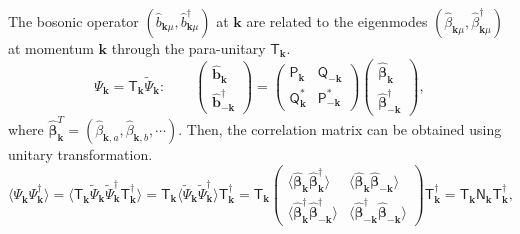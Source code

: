 \documentclass[aps, prx, nofootinbib, superscriptaddress]{revtex4-2}
\newcommand{\kvec}{\mathbf{k}}
\begin{document}
The bosonic operator $(\hat{b}_{\kvec\mu}^{\phantom \dagger}, \hat{b}_{\kvec\mu}^{\dagger} )$ at $\kvec$ are related to the eigenmodes $(\hat{\beta}_{\kvec\mu}^{\phantom \dagger}, \hat{\beta}_{\kvec\mu}^{\dagger} )$ at momentum $\kvec$ through the para-unitary $\mathsf{T}_{\kvec}$. 
\begin{equation}
    \Psi_{\kvec} = \mathsf{T}_{\kvec} \widetilde{\Psi}_{\kvec}: \qquad
    \begin{pmatrix}
        \hat{\bm b}_{\kvec} \\ 
        \hat{\bm b}^{\dagger}_{-\kvec}
    \end{pmatrix}
    = 
    \begin{pmatrix}
        \mathsf{P}_{\kvec}           & \mathsf{Q}_{-\kvec}        \\
        \mathsf{Q}_{\kvec}^{*}       & \mathsf{P}_{-\kvec}^{*}
    \end{pmatrix}
    \begin{pmatrix}
        \hat{\bm\beta}_{\kvec} \\
        \hat{\bm\beta}_{-\kvec}^{\dagger}
    \end{pmatrix},
\end{equation}
where $\hat{\bm\beta}_{\kvec}^{T} = (\hat{\beta}_{\kvec,a}, \hat{\beta}_{\kvec,b}, \cdots)$.
Then, the correlation matrix can be obtained using unitary transformation.
\begin{equation}
    \big 
    \langle \Psi_{\kvec}^{\phantom \dagger} \Psi_{\kvec}^{\dagger} 
    \big \rangle 
    = 
    \big\langle 
    \mathsf{T}_{\kvec}^{\phantom\dagger} \widetilde{\Psi}_{\kvec}^{\phantom\dagger} \widetilde{\Psi}_{\kvec}^{\dagger} \mathsf{T}_{\kvec}^{\dagger} 
    \big\rangle
    = 
    \mathsf{T}_{\kvec} \big\langle \widetilde{\Psi}_{\kvec}^{\phantom\dagger} \widetilde{\Psi}_{\kvec}^{\dagger}  \big \rangle \mathsf{T}_{\kvec}^{\dagger}
    = 
    \mathsf{T}_{\kvec} 
    \begin{pmatrix}
            \langle \hat{\bm \beta}_{ \kvec}^{\phantom \dagger} \hat{\bm \beta}_{ \kvec}^{\dagger}          \rangle            
        &   \langle \hat{\bm \beta}_{ \kvec}^{\phantom \dagger} \hat{\bm \beta}_{-\kvec}^{\phantom \dagger} \rangle\\
            \langle \hat{\bm \beta}_{ \kvec}^{\dagger}          \hat{\bm \beta}_{-\kvec}^{\dagger}          \rangle  
        &   \langle \hat{\bm \beta}_{-\kvec}^{\dagger}          \hat{\bm \beta}_{-\kvec}^{\phantom \dagger} \rangle
    \end{pmatrix}
    \mathsf{T}_{\kvec}^{\dagger}
    =\mathsf{T}_{\kvec}^{\phantom \dagger} \mathsf{N}_{\kvec}^{\phantom \dagger} \mathsf{T}_{\kvec}^{\dagger},
\end{equation}
\end{document}
